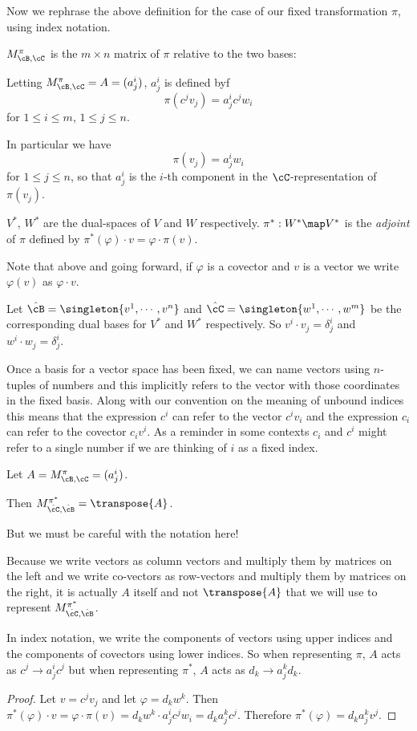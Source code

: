 \documentclass[oneside,12pt]{amsart}
\begin{document}
Now we rephrase the above definition for the case of our fixed transformation $\pi$, using index notation.

$M^{\pi}_{\cB,\cC}$ is the $m\times n$ matrix of $\pi$ 
relative to the two bases:

 Letting $M^{\pi}_{\cB,\cC}=A=(a^i_j)$,
$a^i_j$ is defined byf
$$\pi(c^jv_j) = a^i_j c^j w_i$$
for $1\leq i \leq m$, $1\leq j \leq n$.

In particular we have
$$\pi(v_j) = a^i_j  w_i$$
for $1\leq j \leq n$,
so that $a^i_j$ is the $i$-th component in the $\cC$-representation of $\pi(v_j)$.

\begin{definition}
$V^*$, $W^*$ are the dual-spaces of $V$ and $W$ respectively.
$\pi^*:W^*\map V^*$ is the \emph{adjoint} of $\pi$ defined by
$\pi^*(\varphi) \cdot v = \varphi \cdot \pi(v)$.
\end{definition}

Note that above and going forward, if
$\varphi$ is a covector and $v$ is a vector we write $\varphi(v)$
as $\varphi \cdot v$.

Let
$\hat{\cB} = \singleton{v^1,\cdots,v^n}$ and
$\hat{\cC} = \singleton{w^1,\cdots,w^m}$ be the corresponding
dual bases for $V^*$ and $W^*$ respectively. 
So $v^i \cdot v_j = \delta^i_j$ and $w^i \cdot w_j = \delta^i_j$.

\begin{remark}
Once a basis for a vector space has been fixed,
we can name vectors using $n$-tuples of numbers and this implicitly refers to the vector
with those coordinates in the fixed basis. Along with our convention on the meaning
of unbound indices this means that the expression $c^i$ can refer to the vector $c^i v_i$
and the expression $c_i$ can refer to the covector $c_i v^i$. As a reminder in some
contexts $c_i$ and $c^i$ might refer to a single number if we are thinking of $i$ as a fixed
index.
\end{remark}

\begin{lemma}
Let $A = M^{\pi}_{\cB,\cC} =(a^i_j)$.

Then $M^{\pi^*}_{\hat{\cC},\hat{\cB}}  = \transpose{A}$.

But we must be careful with the notation here!

Because we write vectors as column vectors and multiply them by matrices on the left
and we write co-vectors as row-vectors and multiply them by matrices on the right, it
is actually $A$ itself and not $\transpose{A}$ that we will use to represent
$M^{\pi^*}_{\hat{\cC},\hat{\cB}}$.


In index notation, we write the components of vectors using upper indices and the components
of covectors using lower indices. So when representing $\pi$, $A$ acts as
$c^j \to a^i_jc^j$ but when representing $\pi^*$, $A$ acts as $d_k \to a^k_j d_k$.
\end{lemma}
\begin{proof}
Let $v=c^j v_j$ and let $\varphi = d_k w^k$. Then $\pi^*(\varphi)\cdot v = \varphi \cdot \pi(v)
= d_k w^k \cdot a^i_j c^j w_i = d_k a^k_j c ^ j$. Therefore $\pi^*(\varphi) = d_k a^k_j v^j$.
\end{proof}
\end{document}
